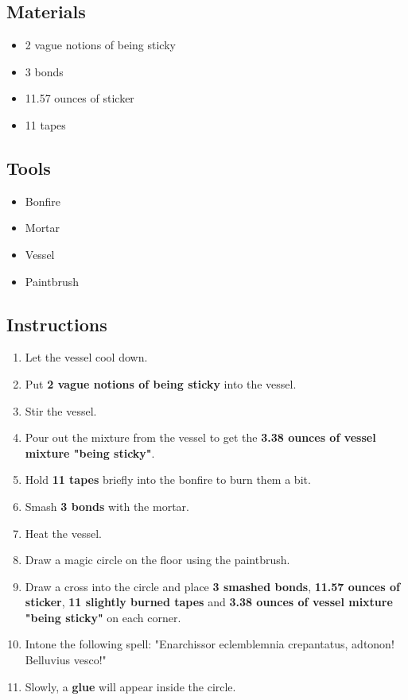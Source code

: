 \documentclass{article}
\begin{document}
\subsection{Materials}\begin{itemize}
\item 
2 vague notions of being sticky
\item 
3 bonds
\item 
11.57 ounces of sticker
\item 
11 tapes
\end{itemize}
\subsection{Tools}\begin{itemize}
\item 
Bonfire
\item 
Mortar
\item 
Vessel
\item 
Paintbrush
\end{itemize}
\subsection{Instructions}\begin{enumerate}
\item 
Let the vessel cool down.
\item 
Put \textbf{2 vague notions of being sticky} into the vessel.
\item 
Stir the vessel.
\item 
Pour out the mixture from the vessel to get the \textbf{3.38 ounces of vessel mixture "being sticky"}.
\item 
Hold \textbf{11 tapes} briefly into the bonfire to burn them a bit.
\item 
Smash \textbf{3 bonds} with the mortar.
\item 
Heat the vessel.
\item 
Draw a magic circle on the floor using the paintbrush.
\item 
Draw a cross into the circle and place \textbf{3 smashed bonds}, \textbf{11.57 ounces of sticker}, \textbf{11 slightly burned tapes} and \textbf{3.38 ounces of vessel mixture "being sticky"} on each corner.
\item 
Intone the following spell: "Enarchissor eclemblemnia crepantatus, adtonon! Belluvius vesco!"
\item 
Slowly, a \textbf{glue} will appear inside the circle.
\end{enumerate}
\newpage
\end{document}
